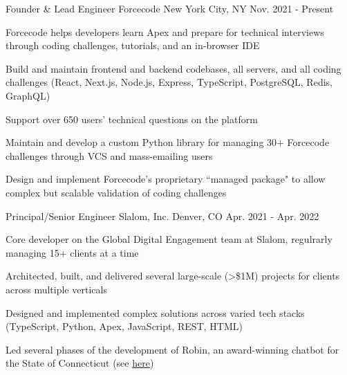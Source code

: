 \begin{cventries}
  \cventry
    {Founder \& Lead Engineer} %
    {Forcecode} %
    {New York City, NY} %
    {Nov. 2021 - Present} %
    {
      \begin{cvitems} %
        \item {Forcecode helps developers learn Apex and prepare for technical interviews through coding challenges, tutorials, and an in-browser IDE}
        \item {Build and maintain frontend and backend codebases, all servers, and all coding challenges (React, Next.js, Node.js, Express, TypeScript, PostgreSQL, Redis, GraphQL)}
        \item {Support over 650 users' technical questions on the platform}
        \item {Maintain and develop a custom Python library for managing 30+ Forcecode challenges through VCS and mass-emailing users}
        \item {Design and implement Forcecode's proprietary ``managed package" to allow complex but scalable validation of coding challenges}
      \end{cvitems}
    }


  \cventry
    {Principal/Senior Engineer} %
    {Slalom, Inc.} %
    {Denver, CO} %
    {Apr. 2021 - Apr. 2022} %
    {
      \begin{cvitems} %
        \item {Core developer on the Global Digital Engagement team at Slalom, regulrarly managing 15+ clients at a time}
        \item {Architected, built, and delivered several large-scale (>\$1M) projects for clients across multiple verticals}
        \item {Designed and implemented complex solutions across varied tech stacks (TypeScript, Python, Apex, JavaScript, REST, HTML)}
        \item {Led several phases of the development of Robin, an award-winning chatbot for the State of Connecticut (see \href{https://portal.ct.gov/das/dasblog/das-team-wins-government-experience-award}{\color{awesome-skyblue}here})}
      \end{cvitems}
    }


\end{cventries}
